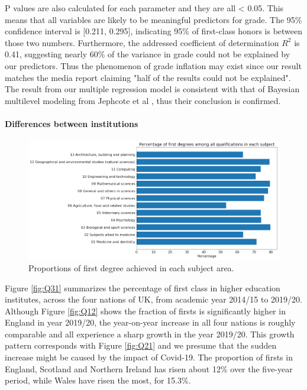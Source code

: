 \documentclass[11pt,a4paper]{article}
\begin{document}
P values are also calculated for each parameter and they are all < 0.05. This means that all variables are likely to be meaningful predictors for grade. The 95\% confidence interval is [0.211, 0.295], indicating 95\% of first-class honors is between those two numbers. Furthermore, the addressed coefficient of determination $R^2$ is 0.41, suggesting nearly 60\% of the variance in grade could not be explained by our predictors. Thus the phenomenon of grade inflation may exist since our result matches the media report claiming "half of the results could not be explained"\cite{news3}. The result from our multiple regression model is consistent with that of Bayesian multilevel modeling from Jephcote et al \cite{BayMain}, thus their conclusion is confirmed. 







\paragraph{Differences between institutions}  
\paragraph{}

\begin{figure}[t]
    \centering
    \includegraphics[width=15.24cm]{report/Q32FFF.pdf}
    \caption{Proportions of first degree achieved in each subject area.}
    \label{fig:Q32}
\end{figure}




Figure \ref{fig:Q31} summarizes the percentage of first class in higher education institutes, across the four nations of UK, from academic year 2014/15 to 2019/20. Although Figure \ref{fig:Q12} shows the fraction of firsts is significantly higher in England in year 2019/20, the year-on-year increase in all four nations is roughly comparable and all experience a sharp growth in the year 2019/20. This growth pattern corresponds with Figure \ref{fig:Q21} and we presume that the sudden increase might be caused by the impact of Covid-19. The proportion of firsts in England, Scotland and Northern Ireland has risen about 12\% over the five-year period, while Wales have risen the most, for 15.3\%. 
\end{document}
